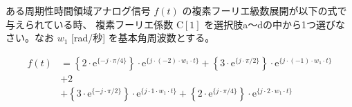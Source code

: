 ある周期性時間領域アナログ信号 $f(t)$ の複素フーリエ級数展開が以下の式で与えられている時、
複素フーリエ係数 $\textrm{C}[1]$ を選択肢a〜dの中から1つ選びなさい。なお $w_1$ [rad/秒] を基本角周波数とする。

\begin{align*}
f(t) 
&= \left \{ 2 \cdot \textrm{e}^{\{-j \cdot \pi/4 \}} \right \} \cdot \textrm{e}^{\{ j \cdot (-2) \cdot w_1 \cdot t \}} 
 + \left \{ 3 \cdot \textrm{e}^{\{ j \cdot \pi/2 \}} \right \} \cdot \textrm{e}^{\{ j \cdot (-1) \cdot w_1 \cdot t \}} \\
&+ 2 \\
&+ \left \{ 3 \cdot \textrm{e}^{\{-j \cdot \pi/2 \}} \right \} \cdot \textrm{e}^{\{ j \cdot    1 \cdot w_1 \cdot t \}} 
 + \left \{ 2 \cdot \textrm{e}^{\{ j \cdot \pi/4 \}} \right \} \cdot \textrm{e}^{\{ j \cdot    2 \cdot w_1 \cdot t \}} 
\end{align*}
